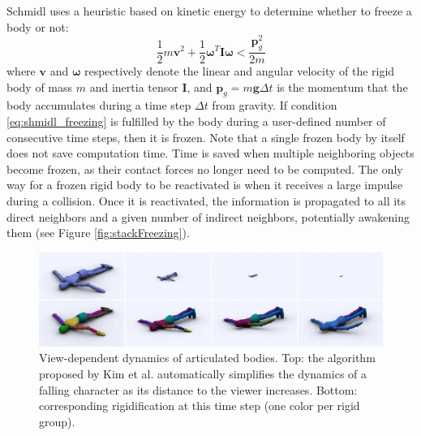 Schmidl \cite{Schmidl2002} uses a heuristic based on kinetic energy to determine whether to freeze a body or not:
\begin{equation}
\label{eq:shmidl_freezing}
\frac{1}{2}m\mathbf{v}^{2} + \frac{1}{2}\mathbf{\omega}^{T}\mathbf{I}\mathbf{\omega} < \frac{\mathbf{p}_{g}^{2}}{2m}
\end{equation}
where $\mathbf{v}$ and $\mathbf{\omega}$ respectively denote the linear and angular velocity of the rigid body of mass $m$ and inertia tensor $\mathbf{I}$, and $\mathbf{p}_{g}=m\mathbf{g}\Delta t$ is the momentum that the body accumulates during a time step $\Delta t$ from gravity.
If condition \eqref{eq:shmidl_freezing} is fulfilled by the body during a user-defined number of consecutive time steps, then it is frozen.
Note that a single frozen body by itself does not save computation time.
Time is saved when multiple neighboring objects become frozen, as their contact forces no longer need to be computed.
The only way for a frozen rigid body to be reactivated is when it receives a large impulse during a collision.
Once it is reactivated, the information is propagated to all its direct neighbors and a given number of indirect neighbors, potentially awakening them (see Figure \ref{fig:stackFreezing}).

\begin{figure}[t]
\includegraphics[width=\linewidth]{./images/starAdaptivity-cgf2016/WMComparisonNoLabels.png}
\caption[STAR adaptivity: Articulated rigid body freezing]{ View-dependent dynamics of articulated bodies. Top: the algorithm proposed by Kim et al. \cite{Kim2008Collision} automatically simplifies the dynamics of a falling character as
its distance to the viewer increases. Bottom: corresponding rigidification at this time step (one color per rigid group). \label{fig:ViewDependentArticulatedBodies}}
\end{figure}

